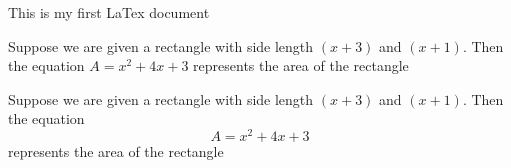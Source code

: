 \documentclass[11pt]{article}
\begin{document}
This is my first LaTex document

Suppose we are given a rectangle with side
length $ (x + 3) $ and $(x + 1)$. 
Then the equation $A=x^2+4x+3$ represents the area of the rectangle

Suppose we are given a rectangle with side
length $ (x + 3) $ and $(x + 1)$. 
Then the equation $$A=x^2+4x+3$$ represents the area of the rectangle
\end{document}
